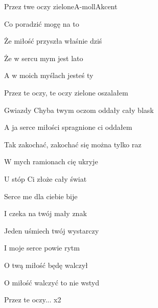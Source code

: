 \begin{song}{Przez twe oczy zielone}{A-moll}{}{Akcent}{}{}
  \begin{SBVerse}
     

      

     

     
  \end{SBVerse}
  \begin{SBVerse}
    Co poradzić mogę na to

    Że miłość przyszła właśnie dziś

    Że w sercu mym jest lato

    A w moich myślach jesteś ty
  \end{SBVerse}
  \begin{SBChorus}
    Przez te oczy, te oczy zielone oszalałem

    Gwiazdy Chyba twym oczom oddały cały blask

    A ja serce miłości spragnione ci oddałem

    Tak zakochać, zakochać się można tylko raz
  \end{SBChorus}
  \begin{SBVerse}
    W mych ramionach cię ukryje

    U stóp Ci złoże cały świat

    Serce me dla ciebie bije

    I czeka na twój mały znak
  \end{SBVerse}
  \begin{SBVerse}
    Jeden uśmiech twój wystarczy

    I moje serce powie rytm

    O twą miłość będę walczył

    O miłość walczyć to nie wstyd
  \end{SBVerse}

  \begin{SBChorus}
    Przez te oczy... x2
  \end{SBChorus}
\end{song}
